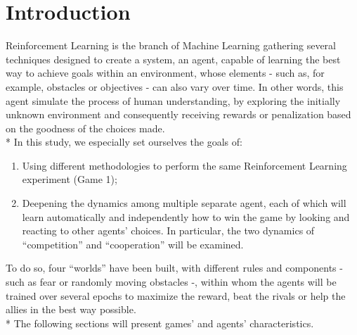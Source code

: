 \newpage
\tableofcontents
\newpage
\section{Introduction}
Reinforcement Learning is the branch of Machine Learning gathering several techniques designed to create a system, an agent, capable of learning the best way to achieve goals within an environment, whose elements - such as, for example, obstacles or objectives - can also vary over time. In other words, this agent simulate the process of human understanding, by exploring the initially unknown environment and consequently receiving rewards or penalization based on the goodness of the choices made.\\*
In this study, we especially set ourselves the goals of:
\begin{enumerate}[noitemsep, topsep=0ex]
	\item Using different methodologies to perform the same Reinforcement Learning experiment (Game 1);
	\item Deepening the dynamics among multiple separate agent, each of which will learn automatically and independently how to win the game by looking and reacting to other agents' choices. In particular, the two dynamics of ``competition'' and ``cooperation'' will be examined.
\end{enumerate}
To do so, four ``worlds'' have been built, with different rules and components - such as fear or randomly moving obstacles -, within whom the agents will be trained over several epochs to maximize the reward, beat the rivals or help the allies in the best way possible.\\*
The following sections will present games' and agents' characteristics.
\newpage


